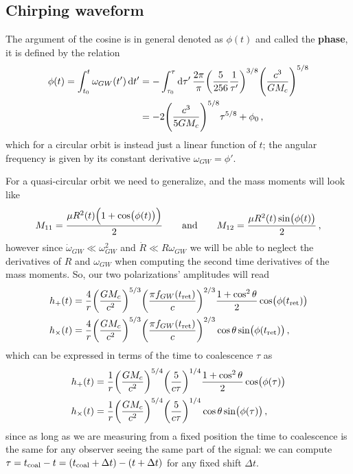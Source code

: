 \documentclass[main.tex]{subfiles}
\begin{document}
\subsection{Chirping waveform}

The argument of the cosine is in general denoted as \(\phi (t)\) and called the \textbf{phase}, it is defined by the relation 
%
\begin{align}
\phi (t) = \int_{t_0 }^{t} \omega_{GW}(t') \dd{t'} &= -\int_{\tau_0 }^{\tau } \dd{\tau '} \frac{2 \pi }{\pi } \qty(\frac{5}{256} \frac{1}{\tau'})^{3/8} \qty(\frac{c^{3}}{G M_c})^{5/8} \\
&= - 2 \qty( \frac{c^3}{5 G M_c})^{5/8} \tau^{5/8} + \phi_0 
\,,
\end{align}
%
which for a circular orbit is instead just a linear function of \(t\); the angular frequency is given by its constant derivative \(\omega_{GW} = \phi'\).

For a quasi-circular orbit we need to generalize, and the mass moments will look like 
%
\begin{align}
M_{11} = \frac{\mu R^2(t) \qty(1 + \cos(\phi (t)))}{2}
\qquad \text{and} \qquad
M_{12} = \frac{\mu R^2(t) \sin(\phi (t))}{2}
\,,
\end{align}
%
however since \(\dot{\omega}_{GW} \ll \omega^2_{GW}\) and \(\dot{R} \ll R  \omega_{GW}\) we will be able to neglect the derivatives of \(R\) and \(\omega_{GW}\) when computing the second time derivatives of the mass moments.
So, our two polarizations' amplitudes will read 
%
\begin{align}
h_{+} (t) &= \frac{4}{r} \qty(\frac{GM_c}{c^2})^{5/3} \qty(\frac{\pi f_{GW} (t _{\text{ret}})}{c})^{2/3} \frac{1 + \cos^2\theta}{2} 
\cos(\phi (t _{\text{ret}})) \\
h_{ \times } (t) &= \frac{4}{r} \qty(\frac{GM_c}{c^2})^{5/3} \qty(\frac{\pi f_{GW} (t _{\text{ret}})}{c})^{2/3} \cos\theta  
\sin(\phi (t _{\text{ret}})) 
\,,
\end{align}
%
which can be expressed in terms of the time to coalescence \(\tau \) as 
%
\begin{align}
h_{+} (t) &= \frac{1}{r} \qty( \frac{G M_c}{c^2})^{5/4} \qty( \frac{5}{c \tau })^{1/4} \frac{1 + \cos^2\theta }{2} \cos(\phi (\tau )) \\
h_{ \times } (t) &= \frac{1}{r} \qty( \frac{G M_c}{c^2})^{5/4} \qty( \frac{5}{c \tau })^{1/4} \cos \theta  \sin(\phi (\tau )) 
\,,
\end{align}
%
since as long as we are measuring from a fixed position the time to coalescence is the same for any observer seeing the same part of the signal: we can compute \(\tau = t _{\text{coal}} -t = \qty(t _{\text{coal}}+ \Delta t) - (t + \Delta t)\) for any fixed shift \(\Delta t\).
\end{document}
